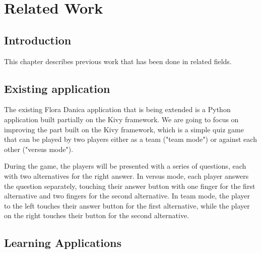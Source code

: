 
\chapter{Related Work}

\label{Chapter2}



\section{Introduction}

This chapter describes previous work that has been done in related fields.


\section{Existing application}

The existing Flora Danica application that is being extended is a Python application built partially on the Kivy framework. We are going to focus on improving the part built on the Kivy framework, which is a simple quiz game that can be played by two players either as a team ("team mode") or against each other ("versus mode").

During the game, the players will be presented with a series of questions, each with two alternatives for the right answer. In versus mode, each player answers the question separately, touching their answer button with one finger for the first alternative and two fingers for the second alternative. In team mode, the player to the left touches their answer button for the first alternative, while the player on the right touches their button for the second alternative.


\section{Learning Applications}

